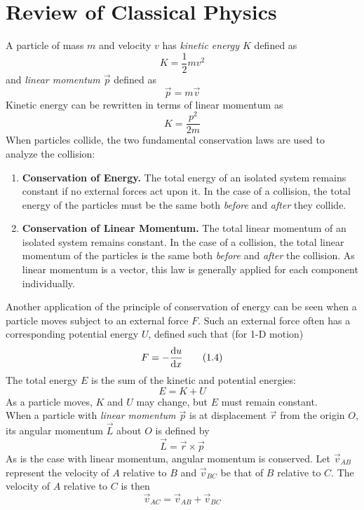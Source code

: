 \documentclass[./Contemporary Physics.tex]{subfiles}
\begin{document}
	\section{Review of Classical Physics}
			A particle of mass \(m\) and velocity \(v\) has \textit{kinetic energy \(K\)} defined as
				\[K = \frac{1}{2}mv^2 \tag{1.1}\]
				and \textit{linear momentum \(\vec{p}\)} defined as
				\[\vec{p} = m\vec{v} \tag{1.2}\]
				Kinetic energy can be rewritten in terms of linear momentum as
				\[K = \frac{p^2}{2m} \tag{1.3}\]
			When particles collide, the two fundamental conservation laws are used to analyze the collision:
				\begin{enumerate}
					\item
						\textbf{Conservation of Energy.} 
							The total energy of an isolated system remains constant if no external forces act upon it. In the case of a collision, the total energy of the particles must be the same both \textit{before} and \textit{after} they collide.
					\item
						\textbf{Conservation of Linear Momentum.}
							The total linear momentum of an isolated system remains constant. In the case of a collision, the total linear momentum of the particles is the same both \textit{before} and \textit{after} the collision. As linear momentum is a vector, this law is generally applied for each component individually.
				\end{enumerate}
			Another application of the principle of conservation of energy can be seen when a particle moves subject to an external force \(F\). Such an external force often has a corresponding potential energy \(U\), defined such that (for 1-D motion)
				\[F = -\dv{u}{x} \tag{1.4}\]
				The total energy \(E\) is the sum of the kinetic and potential energies:
				\[E = K + U \tag{1.5}\]
				As a particle moves, \(K\) and \(U\) may change, but \(E\) must remain constant. \\
			When a particle with \textit{linear momentum \(\vec{p}\)} is at displacement \(\vec{r}\) from the origin \(O\), its angular momentum \(\vec{L}\) about \(O\) is defined by
				\[\vec{L} = \vec{r} \times \vec{p} \tag{1.6}\]
				As is the case with linear momentum, angular momentum is conserved.
				Let \(\vec{v}_{AB}\) represent the velocity of \(A\) relative to \(B\) and \(\vec{v}_{BC}\) be that of \(B\) relative to \(C\). The velocity of \(A\) relative to \(C\) is then
					\[\vec{v}_{AC} = \vec{v}_{AB} + \vec{v}_{BC} \tag{1.7}\]
\end{document}
